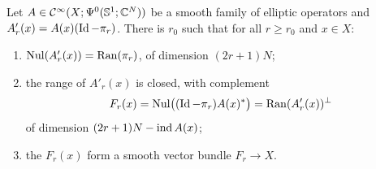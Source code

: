 \begin{lemma}\label{index:lem:stabilized}
  Let $A\in\mathcal{C}^\infty(X;\Psi^{0}(\mathbb{S}^1;\mathbb{C}^N))$ be a smooth family of elliptic
  operators and $A'_r(x)=A(x)(\operatorname{Id}-\pi_r)$. There is $r_0$ such that for all
  $r\ge r_0$ and $x\in X$:
  \begin{enumerate}[label=(\alph*)]
  \item $\operatorname{Nul}(A'_r(x))=\operatorname{Ran}(\pi_r)$, of dimension $(2r+1)N$;
  \item the range of $A'_r(x)$ is closed, with complement
    \begin{equation*}
      F_r(x)=\operatorname{Nul}\bigl((\operatorname{Id}-\pi_r)A(x)^*\bigr)=\operatorname{Ran}(A'_r(x))^\perp
    \end{equation*}
    of dimension $(2r+1)N-\operatorname{ind} A(x)$;
  \item the $F_r(x)$ form a smooth vector bundle $F_r\to X$.
  \end{enumerate}
\end{lemma}
